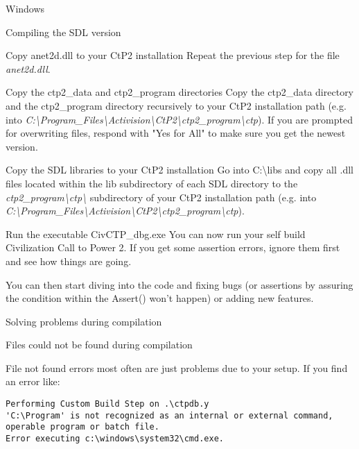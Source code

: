 \begin{section}{Windows}
\begin{subsection}{Compiling the SDL version}
\begin{subsubsection}{Copy anet2d.dll to your CtP2 installation}
Repeat the previous step for the file \textit{anet2d.dll}.
\end{subsubsection}%

\begin{subsubsection}{Copy the ctp2\_data and ctp2\_program directories}
Copy the ctp2\_data directory and the ctp2\_program directory recursively to your CtP2 installation path (e.g. into \textit{C:\textbackslash{}Program\_Files\textbackslash{}Activision\textbackslash{}CtP2\textbackslash{}ctp2\_program\textbackslash{}ctp}). If you are prompted for overwriting files, respond with "Yes for All" to make sure you get the newest version.
\end{subsubsection}%

\begin{subsubsection}{Copy the SDL libraries to your CtP2 installation}
Go into C:\textbackslash{}libs and copy all .dll files located within the lib subdirectory of each SDL directory to the \textit{ctp2\_program\textbackslash{}ctp\textbackslash{}} subdirectory of your CtP2 installation path (e.g. into \textit{C:\textbackslash{}Program\_Files\textbackslash{}Activision\textbackslash{}CtP2\textbackslash{}ctp2\_program\textbackslash{}ctp}).
\end{subsubsection}

\begin{subsubsection}{Run the executable CivCTP\_dbg.exe}
You can now run your self build Civilization Call to Power 2. If you get some assertion errors, ignore them first and see how things are going.

You can then start diving into the code and fixing bugs (or assertions by assuring the condition within the Assert() won't happen) or adding new features.
\end{subsubsection}%

\end{subsection}%

\begin{subsection}{Solving problems during compilation}

\begin{subsubsection}{Files could not be found during compilation}

File not found errors most often are just problems due to your setup.
If you find an error like:
\begin{verbatim}
Performing Custom Build Step on .\ctpdb.y
'C:\Program' is not recognized as an internal or external command,
operable program or batch file.
Error executing c:\windows\system32\cmd.exe.
\end{verbatim}


\end{subsubsection}
\end{subsection}
\end{section}

